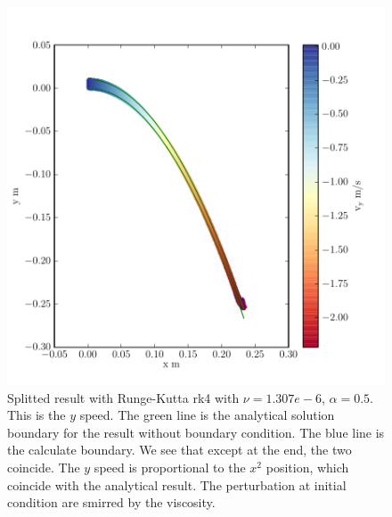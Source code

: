 \begin{figure}
	\includegraphics{topology/lateral_jet/plot_9__2_182.pdf}
		\caption{Splitted result with Runge-Kutta rk4 with $\nu=1.307e-6$, $\alpha=0.5$.
	This is the $y$ speed.
	The green line is the analytical solution boundary for the result without boundary condition.
	The blue line is the calculate boundary.
	We see that except at the end, the two coincide.
	The $y$ speed is proportional to the $x^2$ position, which coincide with the analytical result.
	The perturbation at initial condition are smirred by the viscosity.}
	\label{topo:extrap:lateral:9_2}
\end{figure}


